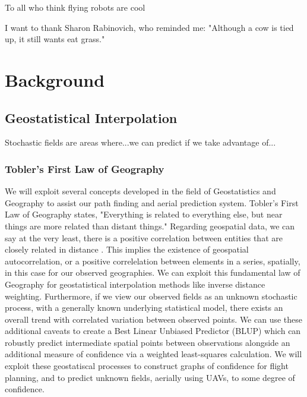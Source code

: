 \documentclass[11pt]{ucthesis}
\begin{document}
\begin{frontmatter}
\begin{dedication}
\null\vfil
{\large
\begin{center}
To all who think flying robots are cool
\vspace{12pt}
\end{center}}
\vfil\null
\end{dedication}


\begin{acknowledgements}
I want to thank Sharon Rabinovich, who reminded me: "Although a cow is tied up, it still wants eat grass."

\end{acknowledgements}

\end{frontmatter}

\part{Background}
\chapter{Geostatistical Interpolation}
Stochastic fields are areas where...we can predict if we take advantage of...
\section{Tobler's First Law of Geography}
We will exploit several concepts developed in the field of Geostatistics and Geography to assist our path finding and aerial prediction system. Tobler's First Law of Geography \cite{tobler:first_law} states, "Everything is related to everything else, but near things are more related than distant things." Regarding geospatial data, we can say at the very least, there is a positive correlation between entities that are closely related in distance \cite{miller:on_toblers_first_law}. This implies the existence of geospatial autocorrelation, or a positive correlelation between elements in a series, spatially, in this case for our observed geographies. We can exploit this fundamental law of Geography for geostatistical interpolation methods like inverse distance weighting. Furthermore, if we view our observed fields as an unknown stochastic process, with a generally known underlying statistical model, there exists an overall trend with correlated variation between observed points. We can use these additional caveats to create a Best Linear Unbiased Predictor (BLUP) which can robustly predict intermediate spatial points between observations alongside an additional measure of confidence via a weighted least-squares calculation. We will exploit these geostatiscal processes to construct graphs of confidence for flight planning, and to predict unknown fields, aerially using UAVs, to some degree of confidence.
\end{document}
